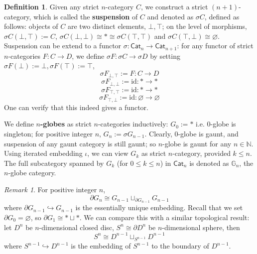 \documentclass{article}
\theoremstyle{definition}
\newtheorem{mydef}{Definition}[section]
\theoremstyle{remark}
\newtheorem*{remark}{Remark}
\begin{document}
\begin{mydef}
Given any strict $n$-category $C$, we construct a strict $(n+1)$-category, which is called the \textbf{suspension} of $C$ and denoted as $\sigma C$, defined as follows: objects of $C$ are two distinct elements, $\bot,\top$; on the level of morphisms, $\sigma C(\bot,\top):=C$, $\sigma C(\bot,\bot) \cong * \cong \sigma C(\top,\top)$ and $\sigma C(\top,\bot) \cong \varnothing$. Suspension can be extend to a functor $\sigma: \mathsf{Cat}_n \to \mathsf{Cat}_{n+1}$: for any functor of strict $n$-categories $F:C \to D$, we define $\sigma F:\sigma C \to \sigma D$ by setting $\sigma F(\bot):=\bot, \sigma F(\top):=\top$, $$ \sigma F_{\bot,\top}:=F:C \to D $$ $$ \sigma F_{\bot,\bot}:=\mathrm{id}: * \to * $$ $$ \sigma F_{\top,\top}:=\mathrm{id}:* \to * $$ $$ \sigma F_{\top,\bot}:=\mathrm{id}: \varnothing \to \varnothing $$ One can verify that this indeed gives a functor.

We define \textbf{$n$-globes} as strict $n$-categories inductively: $G_0:=*$ i.e. $0$-globe is singleton; for positive integer $n$, $G_n:=\sigma G_{n-1}$. Clearly, $0$-globe is gaunt, and suspension of any gaunt category is still gaunt; so $n$-globe is gaunt for any $n \in \mathbb{N}$. Using iterated embedding $\iota$, we can view $G_k$ as strict $n$-category, provided $k \leq n$. The full subcategory spanned by $G_k$ (for $0 \leq k \leq n$) in $\mathsf{Cat}_n$ is denoted as $\mathbb{G}_n$, the $n$-globe category.
\end{mydef}

\begin{remark}
For positive integer $n$, $$\partial G_n \cong G_{n-1} \sqcup_{\partial G_{n-1}} G_{n-1}$$ where $\partial G_{n-1} \hookrightarrow G_{n-1}$ is the essentially unique embedding. Recall that we set $\partial G_0 = \varnothing$, so $\partial G_1 \cong * \sqcup *$. We can compare this with a similar topological result: let $D^n$ be $n$-dimensional closed disc, $S^n \cong \partial D^n$ be $n$-dimensional sphere, then $$ S^n \cong D^{n-1} \sqcup_{S^{n-1}} D^{n-1} $$ where $S^{n-1} \hookrightarrow D^{n-1}$ is the embedding of $S^{n-1}$ to the boundary of $D^{n-1}$.
\end{remark}
\end{document}
